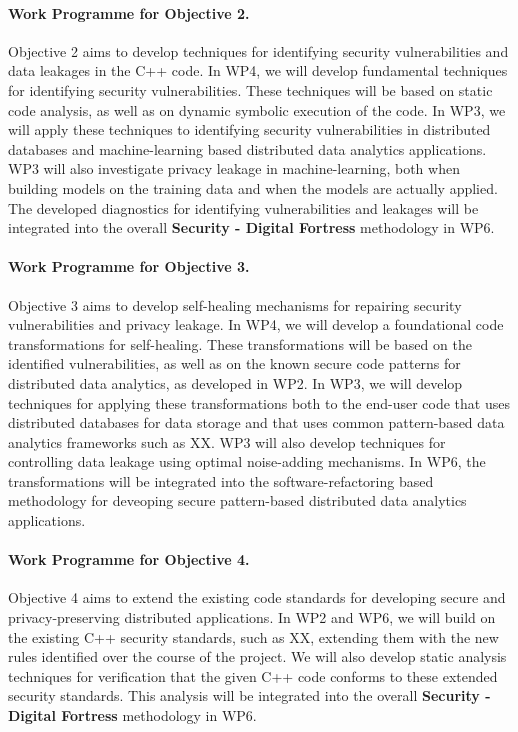 \documentclass[a4paper,11pt]{article}
\newcommand{\project}[1]{\textbf{#1}\xspace}
\newcommand{\SECURITY}{\project{Security - Digital Fortress}}
\newcommand{\TheProject}{\SECURITY}
\begin{document}
\paragraph*{Work Programme for Objective 2.}

Objective 2 aims to develop techniques for identifying security vulnerabilities and data leakages in the C++ code. In WP4, we will develop fundamental techniques for identifying security vulnerabilities. These techniques will be based on static code analysis, as well as on dynamic symbolic execution of the code. In WP3, we will apply these techniques to identifying security vulnerabilities in distributed databases and machine-learning based distributed data analytics applications. WP3 will also investigate privacy leakage in machine-learning, both when building models on the training data and when the models are actually applied. The developed diagnostics for identifying vulnerabilities and leakages will be integrated into the overall \TheProject{} methodology in WP6.

\paragraph{Work Programme for Objective 3.}

Objective 3 aims to develop self-healing mechanisms for repairing security vulnerabilities and privacy leakage. In WP4, we will develop a foundational code transformations for self-healing. These transformations will be based on the identified vulnerabilities, as well as on the known secure code patterns for distributed data analytics, as developed in WP2. In WP3, we will develop techniques for applying these transformations both to the end-user code that uses distributed databases for data storage and that uses common pattern-based data analytics frameworks such as XX. WP3 will also develop techniques for controlling data leakage using optimal noise-adding mechanisms. In WP6, the transformations will be integrated into the software-refactoring based methodology for deveoping secure pattern-based distributed data analytics applications. 

\paragraph{Work Programme for Objective 4.}

Objective 4 aims to extend the existing code standards for developing secure and privacy-preserving distributed applications. In WP2 and WP6, we will build on the existing C++ security standards, such as XX, extending them with the new rules identified over the course of the project. We will also develop static analysis techniques for verification that the given C++ code conforms to these extended security standards. This analysis will be integrated into the overall \TheProject{} methodology in WP6.
\end{document}

